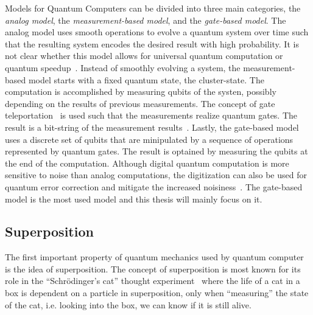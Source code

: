 Models for Quantum Computers can be divided into three main categories, the \emph{analog model}, the \emph{measurement-based model}, and the \emph{gate-based model}. The analog model uses smooth operations to evolve a quantum system over time such that the resulting system encodes the desired result with high probability. It is not clear whether this model allows for universal quantum computation or quantum speedup~\cite{DiCh20}. Instead of smoothly evolving a system, the measurement-based model starts with a fixed quantum state, the cluster-state. The computation is accomplished by measuring qubits of the systen, possibly depending on the results of previous measurements. The concept of gate teleportation~ is used such that the measurements realize quantum gates. The result is a bit-string of the measurement results~\cite{DiCh20, Niel06}. Lastly, the gate-based model uses a discrete set of qubits that are minipulated by a sequence of operations represented by quantum gates. The result is optained by measuring the qubits at the end of the computation. Although digital quantum computation is more sensitive to noise than analog computations, the digitization can also be used for quantum error correction and mitigate the increased noisiness~\cite{DiCh20}. The gate-based model is the most used model and this thesis will mainly focus on it. 

\subsection{Superposition} 
The first important property of quantum mechanics used by quantum computer is the idea of superposition. The concept of superposition is most known for its role in the ``Schrödinger's cat'' thought experiment~\cite{Wine13} where the life of a cat in a box is dependent on a particle in superposition, only when ``measuring'' the state of the cat, i.e. looking into the box, we can know if it is still alive. 

